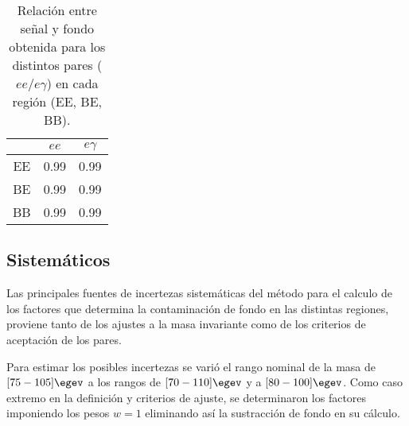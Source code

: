 
\begin{table}
\centering
\caption{Relación entre señal y fondo obtenida para los distintos pares ($ee/e\gamma$) en cada región (EE, BE, BB).}
\begin{tabular}{ c c c }

	\hline
	\hline

	 & $ee$ & $e\gamma$ \\

	\hline

	EE & 0.99 & 0.99 \\

	BE & 0.99 & 0.99 \\

	BB & 0.99 & 0.99 \\

	\hline
	\hline
\end{tabular}
\label{ta:weights}
\end{table}



\subsection{Sistemáticos}


Las principales fuentes de incertezas sistemáticas del método para el calculo de los factores que determina la contaminación de fondo en las distintas regiones, proviene tanto de los ajustes a la masa invariante como de los criterios de aceptación de los pares.  

Para estimar los posibles incertezas se varió el rango nominal de la masa de $[75-105]\egev$ a los rangos de $[70-110]\egev$ y a $[80-100]\egev$. Como caso extremo en la definición y criterios de ajuste, se determinaron los factores imponiendo los pesos $w=1$ eliminando así la sustracción de fondo en su cálculo. 

